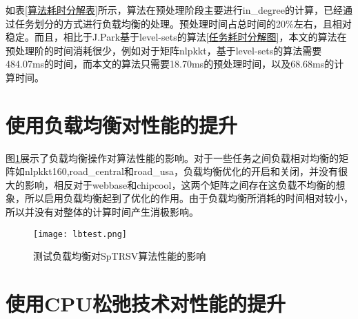 \begin{table}[htbp]
    \scriptsize
    \caption{算法耗时分解表}
    \label{算法耗时分解表}
\end{table}

如表\ref{算法耗时分解表}所示，算法在预处理阶段主要进行in\_degree的计算，已经通过任务划分的方式进行负载均衡的处理。预处理时间占总时间的20\%左右，且相对稳定。而且，相比于J.Park\cite{park2014sparsifying}基于level-sets的算法\ref{任务耗时分解图}，本文的算法在预处理阶的时间消耗很少，例如对于矩阵nlpkkt，基于level-sets的算法需要484.07ms的时间，而本文的算法只需要18.70ms的预处理时间，以及68.68ms的计算时间。


\section{使用负载均衡对性能的提升}

图\ref{测试负载均衡对SpTRSV算法性能的影响}展示了负载均衡操作对算法性能的影响。对于一些任务之间负载相对均衡的矩阵如nlpkkt160,road\_central和road\_usa，负载均衡优化的开启和关闭，并没有很大的影响，相反对于webbase和chipcool，这两个矩阵之间存在这负载不均衡的想象，所以启用负载均衡起到了优化的作用。由于负载均衡所消耗的时间相对较小，所以并没有对整体的计算时间产生消极影响。

\begin{figure}[htbp]
    \centering
    \texttt{[image: lbtest.png]}
    \caption{测试负载均衡对SpTRSV算法性能的影响}
    \label{测试负载均衡对SpTRSV算法性能的影响}
\end{figure}

\section{使用CPU松弛技术对性能的提升}

